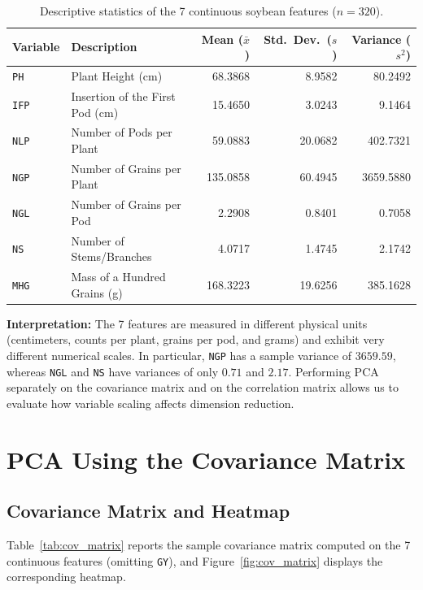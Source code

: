 \documentclass[11pt,a4paper]{article}
\begin{document}
\begin{table}[H]
\centering
\caption{Descriptive statistics of the 7 continuous soybean features ($n = 320$).}
\label{tab:dataset}
\begin{tabular}{llrrr}
\toprule
\textbf{Variable} & \textbf{Description} & \textbf{Mean ($\bar{x}$)} & \textbf{Std.\ Dev.\ ($s$)} & \textbf{Variance ($s^2$)} \\
\midrule
\texttt{PH}  & Plant Height (cm)                &  68.3868 &  8.9582 &   80.2492 \\
\texttt{IFP} & Insertion of the First Pod (cm)  &  15.4650 &  3.0243 &    9.1464 \\
\texttt{NLP} & Number of Pods per Plant         &  59.0883 & 20.0682 &  402.7321 \\
\texttt{NGP} & Number of Grains per Plant       & 135.0858 & 60.4945 & 3659.5880 \\
\texttt{NGL} & Number of Grains per Pod         &   2.2908 &  0.8401 &    0.7058 \\
\texttt{NS}  & Number of Stems/Branches         &   4.0717 &  1.4745 &    2.1742 \\
\texttt{MHG} & Mass of a Hundred Grains (g)     & 168.3223 & 19.6256 &  385.1628 \\
\bottomrule
\end{tabular}
\end{table}

\noindent
\textbf{Interpretation:} The 7 features are measured in different physical units (centimeters, counts per plant, grains per pod, and grams) and exhibit very different numerical scales. In particular, \texttt{NGP} has a sample variance of $3659.59$, whereas \texttt{NGL} and \texttt{NS} have variances of only $0.71$ and $2.17$. Performing PCA separately on the covariance matrix and on the correlation matrix allows us to evaluate how variable scaling affects dimension reduction.

\section{PCA Using the Covariance Matrix}

\subsection{Covariance Matrix and Heatmap}

Table~\ref{tab:cov_matrix} reports the sample covariance matrix computed on the 7 continuous features (omitting \texttt{GY}), and Figure~\ref{fig:cov_matrix} displays the corresponding heatmap.
\end{document}
